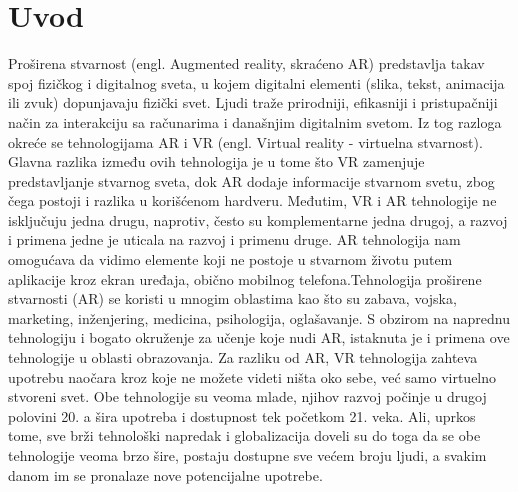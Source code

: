 \documentclass[a4paper]{article}
\begin{document}
	\section{Uvod}
	\label{sec:Uvod}
	Proširena stvarnost (engl. Augmented reality, skraćeno AR) predstavlja takav spoj fizičkog i digitalnog sveta, u kojem digitalni elementi (slika, tekst, 
	animacija ili zvuk) dopunjavaju fizički svet. Ljudi traže prirodniji, efikasniji i pristupačniji način za interakciju sa računarima i današnjim digitalnim 
	svetom. Iz tog razloga okreće se tehnologijama AR i VR (engl. Virtual reality - virtuelna stvarnost). Glavna razlika između ovih tehnologija je u tome što VR 
	zamenjuje predstavljanje stvarnog sveta, dok AR dodaje informacije stvarnom svetu, zbog čega postoji i razlika u korišćenom hardveru. Međutim, VR i AR 
	tehnologije ne isključuju jedna drugu, naprotiv, često su komplementarne jedna drugoj, a razvoj i primena jedne je uticala na razvoj i primenu druge. AR 
	tehnologija nam omogućava da vidimo elemente koji ne postoje u stvarnom životu putem aplikacije kroz ekran uređaja, obično mobilnog telefona.Tehnologija 
	proširene stvarnosti (AR) se koristi u mnogim oblastima kao što su zabava, vojska, marketing, inženjering, medicina, psihologija, oglašavanje. S obzirom na 
	naprednu tehnologiju i bogato okruženje za učenje koje nudi AR, istaknuta je i primena ove tehnologije u oblasti obrazovanja. Za razliku od AR, VR tehnologija 
	zahteva upotrebu naočara kroz koje ne možete videti ništa oko sebe, već samo virtuelno stvoreni svet. Obe tehnologije su veoma mlade, njihov razvoj počinje u 
	drugoj polovini 20. a šira upotreba i dostupnost tek početkom 21. veka. Ali, uprkos tome, sve brži tehnološki napredak i globalizacija doveli su do toga da se 
	obe tehnologije veoma brzo šire, postaju dostupne sve većem broju ljudi, a svakim danom im se pronalaze nove potencijalne upotrebe.
\end{document}
